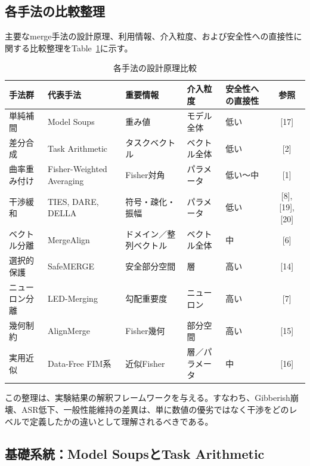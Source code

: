 \subsection{各手法の比較整理}
主要なmerge手法の設計原理、利用情報、介入粒度、および安全性への直接性に関する比較整理をTable~\ref{tab:method_comparison}に示す。
\begin{table}[t]
\centering
\caption{各手法の設計原理比較}
\label{tab:method_comparison}
\small
\begin{tabular}{p{2.0cm}p{2.4cm}p{2.5cm}p{2.0cm}p{2.2cm}c}
\toprule
手法群 & 代表手法 & 重要情報 & 介入粒度 & 安全性への直接性 & 参照 \\
\midrule
単純補間 & Model Soups & 重み値 & モデル全体 & 低い & [17] \\

差分合成 & Task Arithmetic & タスクベクトル & ベクトル全体 & 低い & [2] \\

曲率重み付け & Fisher-Weighted Averaging & Fisher対角 & パラメータ & 低い〜中 & [1] \\

干渉緩和 & TIES, DARE, DELLA & 符号・疎化・振幅 & パラメータ & 低い & [8], [19], [20] \\

ベクトル分離 & MergeAlign & ドメイン／整列ベクトル & ベクトル全体 & 中 & [6] \\

選択的保護 & SafeMERGE & 安全部分空間 & 層 & 高い & [14] \\

ニューロン分離 & LED-Merging & 勾配重要度 & ニューロン & 高い & [7] \\

幾何制約 & AlignMerge & Fisher幾何 & 部分空間 & 高い & [15] \\

実用近似 & Data-Free FIM系 & 近似Fisher & 層／パラメータ & 中 & [16] \\
\bottomrule
\end{tabular}
\end{table}

この整理は、実験結果の解釈フレームワークを与える。すなわち、Gibberish崩壊、ASR低下、一般性能維持の差異は、単に数値の優劣ではなく干渉をどのレベルで定義したかの違いとして理解されるべきである。


\subsection{基礎系統：Model SoupsとTask Arithmetic}

